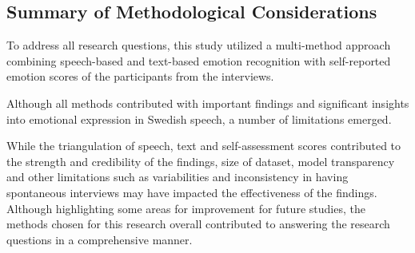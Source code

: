 \subsection{Summary of Methodological Considerations}
To address all research questions, this study utilized a multi-method approach combining speech-based and text-based emotion recognition with self-reported emotion scores of the participants from the interviews. 

Although all methods contributed with important findings and significant insights into emotional expression in Swedish speech, a number of limitations emerged.

While the triangulation of speech, text and self-assessment scores contributed to the strength and credibility of the findings, size of dataset, model transparency and other limitations such as variabilities and inconsistency in having spontaneous interviews may have impacted the effectiveness of the findings. Although highlighting some areas for improvement for future studies, the methods chosen for this research overall contributed to answering the research questions in a comprehensive manner.
